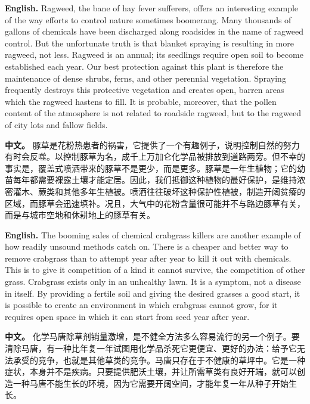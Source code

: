 \noindent\textbf{English.} Ragweed, the bane of hay fever sufferers, offers an interesting example of the way efforts to control nature sometimes boomerang. Many thousands of gallons of chemicals have been discharged along roadsides in the name of ragweed control. But the unfortunate truth is that blanket spraying is resulting in more ragweed, not less. Ragweed is an annual; its seedlings require open soil to become established each year. Our best protection against this plant is therefore the maintenance of dense shrubs, ferns, and other perennial vegetation. Spraying frequently destroys this protective vegetation and creates open, barren areas which the ragweed hastens to fill. It is probable, moreover, that the pollen content of the atmosphere is not related to roadside ragweed, but to the ragweed of city lots and fallow fields.
\par
\noindent\textbf{中文。} 豚草是花粉热患者的祸害，它提供了一个有趣例子，说明控制自然的努力有时会反噬。以控制豚草为名，成千上万加仑化学品被排放到道路两旁。但不幸的事实是，覆盖式喷洒带来的豚草不是更少，而是更多。豚草是一年生植物；它的幼苗每年都需要裸露土壤才能定居。因此，我们抵御这种植物的最好保护，是维持浓密灌木、蕨类和其他多年生植被。喷洒往往破坏这种保护性植被，制造开阔贫瘠的区域，而豚草会迅速填补。况且，大气中的花粉含量很可能并不与路边豚草有关，而是与城市空地和休耕地上的豚草有关。
\par\medskip

\noindent\textbf{English.} The booming sales of chemical crabgrass killers are another example of how readily unsound methods catch on. There is a cheaper and better way to remove crabgrass than to attempt year after year to kill it out with chemicals. This is to give it competition of a kind it cannot survive, the competition of other grass. Crabgrass exists only in an unhealthy lawn. It is a symptom, not a disease in itself. By providing a fertile soil and giving the desired grasses a good start, it is possible to create an environment in which crabgrass cannot grow, for it requires open space in which it can start from seed year after year.
\par
\noindent\textbf{中文。} 化学马唐除草剂销量激增，是不健全方法多么容易流行的另一个例子。要清除马唐，有一种比年复一年试图用化学品杀死它更便宜、更好的办法：给予它无法承受的竞争，也就是其他草类的竞争。马唐只存在于不健康的草坪中。它是一种症状，本身并不是疾病。只要提供肥沃土壤，并让所需草类有良好开端，就可以创造一种马唐不能生长的环境，因为它需要开阔空间，才能年复一年从种子开始生长。
\par\medskip

